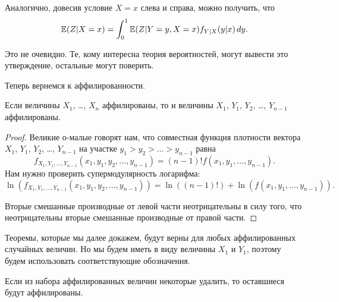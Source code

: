 
Аналогично, довесив условие $X=x$ слева и справа, можно получить, что
\begin{equation}
\label{iterated_e}
\operatorname{\mathbb{E}}(Z|X=x)=\int_{0}^{1}\operatorname{\mathbb{E}}(Z|Y=y, X=x)f_{Y|X}(y|x) \, dy.
\end{equation}

Это не очевидно. Те, кому интересна теория вероятностей, могут вывести это утверждение, остальные могут поверить.

Теперь вернемся к аффилированности.

\begin{myth}
\label{aff_order}
Если величины $ X_{1} $, \ldots, $ X_{n} $ аффилированы, то и величины $ X_{1} $, $ Y_{1} $, $ Y_{2} $, \ldots, $ Y_{n-1} $ аффилированы. 
\end{myth}

\begin{proof}
Великие о-малые говорят нам, что совместная функция плотности вектора $ X_{1} $, $ Y_{1} $, $ Y_{2} $, \ldots, $ Y_{n-1} $ на участке $ y_{1}>y_{2}>\ldots>y_{n-1} $ равна
\begin{equation}
f_{X_{1},Y_{1},\ldots,Y_{n-1}}(x_{1},y_{1},y_{2},\ldots,y_{n-1})=(n-1)!f(x_{1},y_{1},\ldots,y_{n-1}).
\end{equation}
Нам нужно проверить супермодулярность логарифма:
\begin{equation}
\ln(f_{X_{1},Y_{1},\ldots,Y_{n-1}}(x_{1},y_{1},y_{2},\ldots,y_{n-1}))=\ln((n-1)!)+\ln(f(x_{1},y_{1},\ldots,y_{n-1})).
\end{equation}

Вторые смешанные производные от левой части неотрицательны в силу того, что неотрицательны вторые смешанные производные от правой части.

\end{proof}

Теоремы, которые мы далее докажем, будут верны для любых аффилированных случайных величин. Но мы будем иметь в виду величины $ X_{1} $ и $ Y_{1} $, поэтому будем использовать соответствующие обозначения.

\begin{myth}
\label{aff_delete}
Если из набора аффилированных величин некоторые удалить, то оставшиеся будут аффилированы.
\end{myth}

